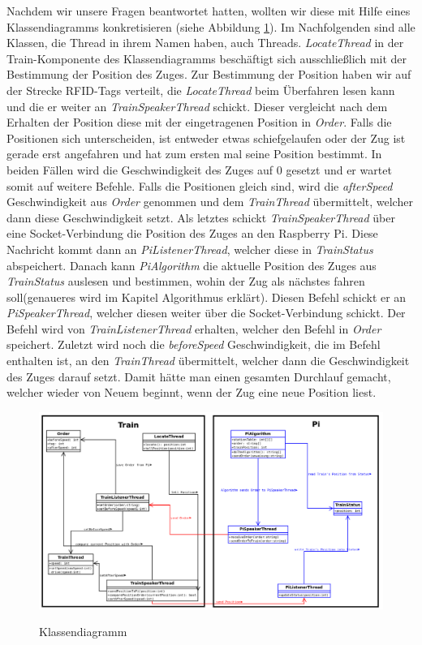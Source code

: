 Nachdem wir unsere Fragen beantwortet hatten, wollten wir diese mit Hilfe eines Klassendiagramms konkretisieren (siehe Abbildung \ref{pic:ClassDiagram}). Im Nachfolgenden sind alle Klassen, die Thread in ihrem Namen haben, auch Threads. \textit{LocateThread} in der Train-Komponente des Klassendiagramms beschäftigt sich ausschließlich mit der Bestimmung der Position des Zuges. Zur Bestimmung der Position haben wir auf der Strecke RFID-Tags verteilt, die \textit{LocateThread} beim Überfahren lesen kann und die er weiter an \textit{TrainSpeakerThread} schickt. Dieser vergleicht nach dem Erhalten der Position diese mit der eingetragenen Position in \textit{Order}. Falls die Positionen sich unterscheiden, ist entweder etwas schiefgelaufen oder der Zug ist gerade erst angefahren und hat zum ersten mal seine Position bestimmt. In beiden Fällen wird die Geschwindigkeit des Zuges auf 0 gesetzt und er wartet somit auf weitere Befehle. Falls die Positionen gleich sind, wird die \textit{afterSpeed} Geschwindigkeit aus \textit{Order} genommen und dem \textit{TrainThread} übermittelt, welcher dann diese Geschwindigkeit setzt. Als letztes schickt \textit{TrainSpeakerThread} über eine Socket-Verbindung die Position des Zuges an den Raspberry Pi. Diese Nachricht kommt dann an \textit{PiListenerThread}, welcher diese in \textit{TrainStatus} abspeichert. Danach kann \textit{PiAlgorithm} die aktuelle Position des Zuges aus \textit{TrainStatus} auslesen und bestimmen, wohin der Zug als nächstes fahren soll(genaueres wird im Kapitel Algorithmus erklärt). Diesen Befehl schickt er an \textit{PiSpeakerThread}, welcher diesen weiter über die Socket-Verbindung schickt. Der Befehl wird von \textit{TrainListenerThread} erhalten, welcher den Befehl in \textit{Order} speichert. Zuletzt wird noch die \textit{beforeSpeed} Geschwindigkeit, die im Befehl enthalten ist, an den \textit{TrainThread} übermittelt, welcher dann die Geschwindigkeit des Zuges darauf setzt. Damit hätte man einen gesamten Durchlauf gemacht, welcher wieder von Neuem beginnt, wenn der Zug eine neue Position liest.  


\begin{figure}[H]	
\caption{Klassendiagramm}
\includegraphics[width=2\textwidth, width=700pt, angle =90]{content/images/ClassDiagram.png}
\label{pic:ClassDiagram}
\end{figure}

